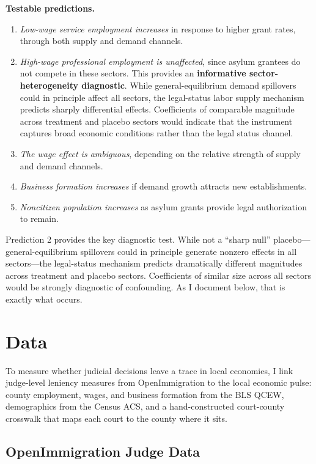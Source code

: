 \documentclass[12pt]{article}
\begin{document}
\textbf{Testable predictions.}
\begin{enumerate}
    \item \textit{Low-wage service employment increases} in response to higher grant rates, through both supply and demand channels.
    \item \textit{High-wage professional employment is unaffected}, since asylum grantees do not compete in these sectors. This provides an \textbf{informative sector-heterogeneity diagnostic}. While general-equilibrium demand spillovers could in principle affect all sectors, the legal-status labor supply mechanism predicts sharply differential effects. Coefficients of comparable magnitude across treatment and placebo sectors would indicate that the instrument captures broad economic conditions rather than the legal status channel.
    \item \textit{The wage effect is ambiguous}, depending on the relative strength of supply and demand channels.
    \item \textit{Business formation increases} if demand growth attracts new establishments.
    \item \textit{Noncitizen population increases} as asylum grants provide legal authorization to remain.
\end{enumerate}

Prediction 2 provides the key diagnostic test. While not a ``sharp null'' placebo---general-equilibrium spillovers could in principle generate nonzero effects in all sectors---the legal-status mechanism predicts dramatically different magnitudes across treatment and placebo sectors. Coefficients of similar size across all sectors would be strongly diagnostic of confounding. As I document below, that is exactly what occurs.


\section{Data}

To measure whether judicial decisions leave a trace in local economies, I link judge-level leniency measures from OpenImmigration to the local economic pulse: county employment, wages, and business formation from the BLS QCEW, demographics from the Census ACS, and a hand-constructed court-county crosswalk that maps each court to the county where it sits.

\subsection{OpenImmigration Judge Data}
\end{document}
